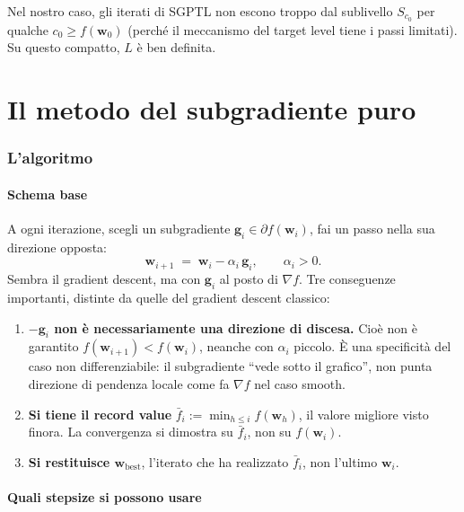 \documentclass[11pt,a4paper]{article}
\newcommand{\bw}{\mathbf{w}}
\newcommand{\bg}{\mathbf{g}}
\theoremstyle{definition}
\begin{document}
Nel nostro caso, gli iterati di SGPTL non escono troppo dal sublivello $S_{c_0}$ per qualche $c_0\ge f(\bw_0)$ (perché il meccanismo del target level tiene i passi limitati). Su questo compatto, $L$ è ben definita.

\part{Il metodo del subgradiente puro}

\section{L'algoritmo}
\label{sec:subgrad-method}

\subsection{Schema base}

A ogni iterazione, scegli un subgradiente $\bg_i\in\partial f(\bw_i)$, fai un passo nella sua direzione opposta:
\[
\bw_{i+1} \;=\; \bw_i - \alpha_i\,\bg_i, \qquad \alpha_i > 0.
\]
Sembra il gradient descent, ma con $\bg_i$ al posto di $\nabla f$. Tre conseguenze importanti, distinte da quelle del gradient descent classico:

\begin{enumerate}[leftmargin=*]
\item \textbf{$-\bg_i$ non è necessariamente una direzione di discesa.} Cioè non è garantito $f(\bw_{i+1}) < f(\bw_i)$, neanche con $\alpha_i$ piccolo. È una specificità del caso non differenziabile: il subgradiente ``vede sotto il grafico'', non punta direzione di pendenza locale come fa $\nabla f$ nel caso smooth.

\item \textbf{Si tiene il record value} $\bar f_i := \min_{h\le i} f(\bw_h)$, il valore migliore visto finora. La convergenza si dimostra su $\bar f_i$, non su $f(\bw_i)$.

\item \textbf{Si restituisce $\bw_{\text{best}}$}, l'iterato che ha realizzato $\bar f_i$, non l'ultimo $\bw_i$.
\end{enumerate}

\subsection{Quali stepsize si possono usare}
\end{document}
